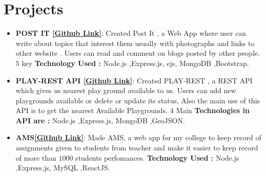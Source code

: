 \documentclass[letterpaper,11pt]{article}
\newcommand{\resumeItem}[2]{
  \item\small{
    \textbf{#1}{: #2 \vspace{-2pt}}
  }
}
\newcommand{\resumeSubItem}[2]{\resumeItem{#1}{#2}\vspace{-4pt}}
\newcommand{\resumeSubHeadingListStart}{\begin{itemize}[leftmargin=*]}
\newcommand{\resumeSubHeadingListEnd}{\end{itemize}}
\begin{document}
\section{Projects}
  \resumeSubHeadingListStart
    \resumeSubItem{POST IT \href{https://github.com/aniketash57/POST-IT-}{[Github Link]}}
      {Created Post It , a Web App where user can write about topics that interest them usually with photographs and links to other website \vspace{0.1mm}.  Users can read and comment on blogs posted by other people. $5$ key  \newline\vspace{0.1mm}\small\textbf{Technology Used :} Node.js ,Express.js, ejs, MongoDB ,Bootstrap.}
    \resumeSubItem{PLAY-REST API \href{https://github.com/aniketash57/PLAY-REST-API}{[Github Link]}}
      {Created PLAY-REST , a REST API which gives us nearest play ground available to us. Users can add new playgrounds available or delete or update its status, Also the main use of this API is to get the nearest Available Playgrounds. $4$ Main  \vspace{0.1mm}\small  \textbf{Technologies in API are :} Node.js ,Express.js, MongoDB ,GeoJSON.}
    \resumeSubItem{AMS\href{https://github.com/aniketash57/AMS}{[Github Link]}}
      {Made AMS, a web app for my college to keep record of assignments given to students from teacher and make it easier to keep record of more than $1000$ students perfomances. \vspace{0.1mm}\small \textbf{Technology Used :} Node.js ,Express.js, MySQL ,ReactJS.}
  \resumeSubHeadingListEnd
\end{document}
